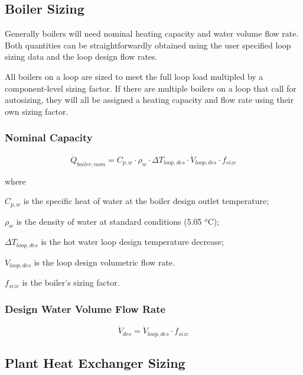 \subsection{Boiler Sizing}\label{boiler-sizing}

Generally boilers will need nominal heating capacity and water volume flow rate. Both quantities can be straightforwardly obtained using the user specified loop sizing data and the loop design flow rates.

All boilers on a loop are sized to meet the full loop load multipled by a component-level sizing factor. If there are multiple boilers on a loop that call for autosizing, they will all be assigned a heating capacity and flow rate using their own sizing factor.

\subsubsection{Nominal Capacity}\label{nominal-capacity}

\begin{equation}
\dot Q_{boiler,nom} = C_{p,w} \cdot \rho_w \cdot \Delta T_{loop,des} \cdot \dot V_{loop,des} \cdot f_{size}
\end{equation}

where

\( C_{p,w} \) is the specific heat of water at the boiler design outlet temperature;

\( \rho_w \) is the density of water at standard conditions (5.05 \(^{o}\)C);

\( \Delta T_{loop,des} \) is the hot water loop design temperature decrease;

\( \dot V_{loop,des} \) is the loop design volumetric flow rate.

\( f_{size} \) is the boiler's sizing factor.

\subsubsection{Design Water Volume Flow Rate}\label{design-boiler-water-flow-rate-1}

\begin{equation}
\dot V_{des} = \dot V_{loop,des} \cdot f_{size}
\end{equation}

\subsection{Plant Heat Exchanger Sizing}\label{plant-heat-exchanger-sizing}

